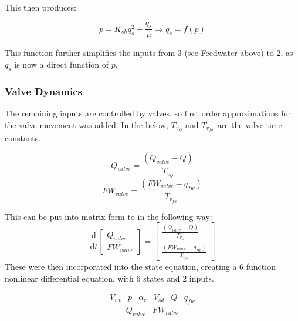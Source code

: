             This then produces: 
            
            $$p  = K_{sh} q_s^{2} + \frac{ q_s}{\mu} \Longrightarrow  q_s = f(p)$$
            
            This function further simplifies the inputs from 3 (see Feedwater above) to 2, as $q_s$ is now a direct function of $p$. 
            
        \subsubsection{Valve Dynamics}
            The remaining inputs are controlled by valves, so first order approximations for the valve movement was added. In the below, $T_{v_{Q }}$ and $T_{v_{fw}}$ are the valve time constants.  
            
            $$ \dot{Q}_{valve}  = \frac{\left(  Q_{valve}  - Q       \right)}{T_{v_{Q }}}$$
            $$ \dot{FW}_{valve} = \frac{\left( FW_{valve}  - q_{fw}  \right)}{T_{v_{fw}}}$$
            
            This can be put into matrix form to in the following way:
            \begin{equation}
                \frac{\mathrm{d} }{\mathrm{d} t} 
                \left [ \begin{matrix} Q_{valve} \\ FW_{valve} \end{matrix} \right ]  
                =
                \left[ \begin{matrix} \frac{\left(  Q_{valve}  - Q       \right)}{T_{v_{Q }}} \\\frac{\left( FW_{valve}  - q_{fw}  \right)}{T_{v_{fw}}}   \end{matrix} \right]
                \label{eq:Valve_model_A}
            \end{equation}
            These were then incorporated into the state equation, creating a 6 function nonlinear differential equation, with 6 states and 2 inputs. 
            
            $$ \begin{matrix} V_{wt} & p& \alpha_r& V_{sd} & Q & q_{fw}\end{matrix} $$
            $$ \begin{matrix} Q_{valve} & FW_{valve} \end{matrix} $$
        
